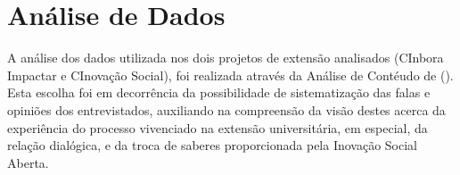 \section{Análise de Dados}
\label{resultadoanalise}

A análise dos dados utilizada nos dois projetos de extensão analisados (CInbora Impactar e CInovação Social), foi realizada através da Análise de Contéudo de \citeauthor{bardin2011} (\citeyear{bardin2011}). Esta escolha foi em decorrência da possibilidade de sistematização das falas e opiniões dos entrevistados, auxiliando na compreensão da visão destes acerca da experiência do processo vivenciado na extensão universitária, em especial, da relação dialógica, e da troca de saberes proporcionada pela Inovação Social Aberta.




